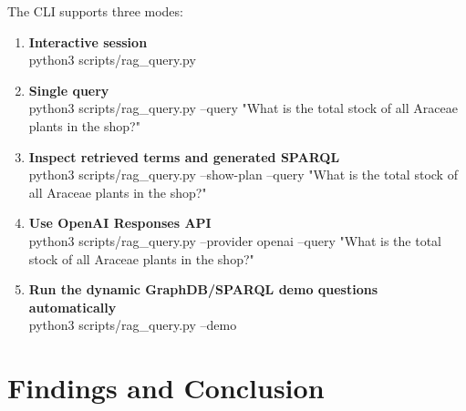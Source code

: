 \documentclass[11pt,a4paper]{article}
\begin{document}
The CLI supports three modes:
\begin{enumerate}
\item \textbf{Interactive session}
\\python3 scripts/rag\_query.py

\item \textbf{Single query}
\\python3 scripts/rag\_query.py --query "What is the total stock of all Araceae plants in the shop?"

\item \textbf{Inspect retrieved terms and generated SPARQL}
\\python3 scripts/rag\_query.py --show-plan --query "What is the total stock of all Araceae plants in the shop?"

\item \textbf{Use OpenAI Responses API}
\\python3 scripts/rag\_query.py --provider openai --query "What is the total stock of all Araceae plants in the shop?"

\item \textbf{Run the dynamic GraphDB/SPARQL demo questions automatically}
\\python3 scripts/rag\_query.py --demo

\end{enumerate}

\section{Findings and Conclusion}
\end{document}
